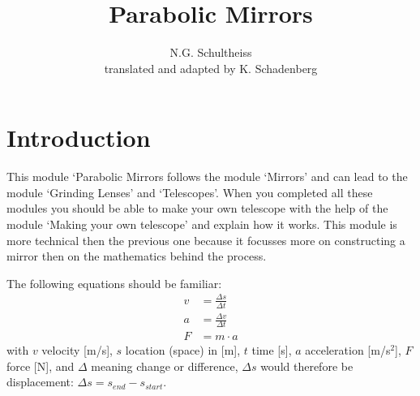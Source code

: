 \documentclass[12pt,a4paper]{article}
\author{N.G. Schultheiss \\ translated and adapted by K. Schadenberg}
\date{}
\title{Parabolic Mirrors}
\numberwithin{equation}{section}
\numberwithin{figure}{section}
\numberwithin{table}{section}
\begin{document}
\maketitle

\section{Introduction}
This module `Parabolic Mirrors follows the module `Mirrors' and can lead to the module `Grinding Lenses' and `Telescopes'. When you completed all these modules you should be able to make your own telescope with the help of the module `Making your own telescope' and explain how it works. This module is more technical then the previous one because it focusses more on constructing a mirror then on the mathematics behind the process.

The following equations should be familiar:
\begin{align}
v &= \frac{\Delta s}{\Delta t} \\
a &= \frac{\Delta v}{\Delta t} \\
F &= m \cdot a \label{eq:newton2}
\end{align}
with $v$ velocity [m/s], $s$ location (space) in [m], $t$ time [s], $a$ acceleration [m/s$^{2}$], $F$ force [N], and $\Delta$ meaning change or difference, $\Delta s$ would therefore be displacement: $\Delta s = s_{end} - s_{start}$.
\end{document}
